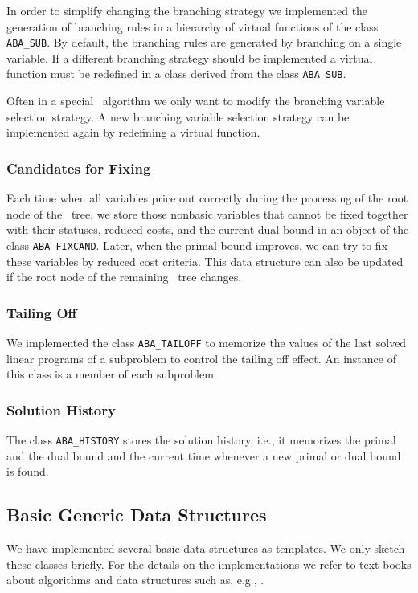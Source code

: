 In order to simplify changing the branching strategy we implemented
the generation of branching rules in a hierarchy of virtual functions
of the class {\tt ABA\_SUB}. By default, the branching rules are generated
by branching on a single variable. If a different branching
strategy should be implemented a virtual function
must be redefined in a class derived from the class {\tt ABA\_SUB}.

Often in a special \bac\ algorithm we only want to modify the branching
variable selection strategy. 
A new branching variable selection strategy can be implemented again by
redefining a virtual function.

\subsubsection{Candidates for Fixing}

Each time when all variables price out correctly during the processing
of the root node of the \bab\ tree,
we store those nonbasic variables that cannot be fixed together with
their statuses, reduced costs, and the current dual bound in an
object of the class {\tt ABA\_FIXCAND}. 
Later, when the primal bound improves,
we can try to fix these variables by reduced cost criteria. This
data structure can also be updated if the root node of the remaining
\bab\ tree changes.

\subsubsection{Tailing Off}
\noindent
We implemented the class {\tt ABA\_TAILOFF} to
memorize the values of the
last solved linear programs of a subproblem to control the 
tailing off effect. An instance of this class is a member of each subproblem.

\subsubsection{Solution History}
\noindent
The class {\tt ABA\_HISTORY} stores
the solution history, i.e., it memorizes
the primal and the dual bound and the current time whenever a 
new primal or dual bound is found.

\subsection{Basic Generic Data Structures}
\noindent
We have implemented several basic data structures as templates. 
We only sketch these classes briefly. For the
details on the implementations we refer to text books
about algorithms and data structures such as, e.g., \cite{CLR90}.


